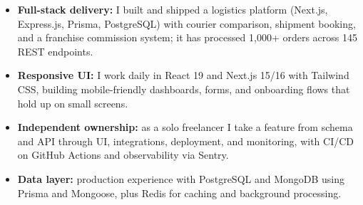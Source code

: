 \documentclass[]{cover}
\begin{document}


\currentdate{\today}



{\raggedright{}\fontsize{11pt}{13pt}\selectfont
\renewcommand{\labelitemi}{\textbullet}
\renewcommand{\labelitemii}{\textbullet}
\renewcommand{\labelitemiii}{\textbullet}
\begin{itemize}
    \item \textbf{Full-stack delivery:} I built and shipped a logistics platform (Next.js, Express.js, Prisma, PostgreSQL) with courier comparison, shipment booking, and a franchise commission system; it has processed 1,000+ orders across 145 REST endpoints.
    \item \textbf{Responsive UI:} I work daily in React 19 and Next.js 15/16 with Tailwind CSS, building mobile-friendly dashboards, forms, and onboarding flows that hold up on small screens.
    \item \textbf{Independent ownership:} as a solo freelancer I take a feature from schema and API through UI, integrations, deployment, and monitoring, with CI/CD on GitHub Actions and observability via Sentry.
    \item \textbf{Data layer:} production experience with PostgreSQL and MongoDB using Prisma and Mongoose, plus Redis for caching and background processing.
\end{itemize}\par}
\vspace{6pt}
\end{document}
